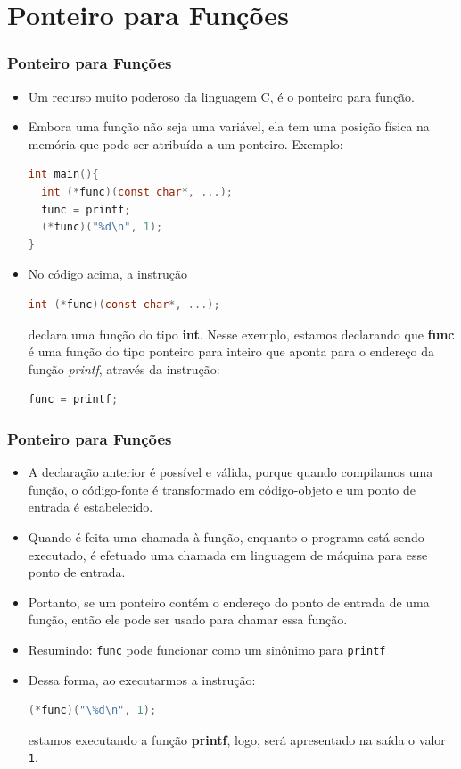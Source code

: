 \section{Ponteiro para Funções}
\begin{frame}[fragile,c]
\frametitle{Ponteiro para Funções}

  \begin{itemize}[<+->]
    \item Um recurso muito poderoso da linguagem C, é o ponteiro para função.
    \item Embora uma função não seja uma variável, ela tem uma posição física na memória que pode ser atribuída a um ponteiro. Exemplo:
\begin{lstlisting}[language=C]
int main(){
  int (*func)(const char*, ...);
  func = printf;
  (*func)("%d\n", 1);
}
\end{lstlisting}
 \item No código acima, a instrução
\begin{lstlisting}[language=C]
 int (*func)(const char*, ...);
\end{lstlisting} 
declara uma função do tipo \textbf{int}. Nesse exemplo, estamos declarando que \textbf{func} é uma função do tipo ponteiro para inteiro que aponta para o endereço da função \textit{printf}, através da instrução: 
\begin{lstlisting}[language=C]
 func = printf;
\end{lstlisting}
\end{itemize}
\end{frame}
\begin{frame}[fragile,c]
\frametitle{Ponteiro para Funções}
\begin{itemize}[<+->]
  \item A declaração anterior é possível e válida, porque quando compilamos uma função, o código-fonte é transformado em código-objeto e um ponto de entrada é estabelecido. 
  \item Quando é feita uma chamada à função, enquanto o programa está sendo executado, é efetuado uma chamada em linguagem de máquina para esse ponto de entrada.
  \item Portanto, se um ponteiro contém o endereço do ponto de entrada de uma função, então ele pode ser usado para chamar essa função.

\item Resumindo: \texttt{func} pode funcionar como um sinônimo para \texttt{printf}

  \item Dessa forma, ao executarmos a instrução:
\begin{lstlisting}[language=C]
(*func)("\%d\n", 1);
\end{lstlisting} 
estamos executando a função \textbf{printf}, logo, será apresentado na saída o valor \texttt{1}.
\end{itemize}
\end{frame}

